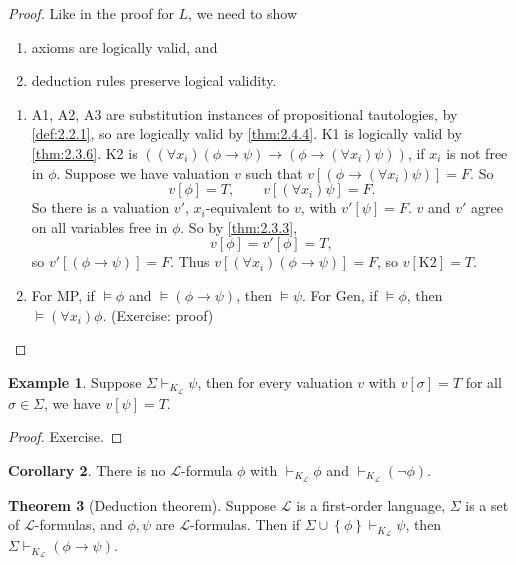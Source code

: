 \documentclass{article}
\renewcommand{\L}{\mathcal{L}}
\newcommand{\rb}[1]{\left( #1 \right)}
\renewcommand{\sb}[1]{\left[ #1 \right]}
\newcommand{\cb}[1]{\left\{ #1 \right\}}
\newcommand{\notb}[1]{\rb{\neg #1}}
\newcommand{\impb}[2]{\rb{#1 \rightarrow #2}}
\newcommand{\fab}[1]{\rb{\forall #1}}
\theoremstyle{definition}\newtheorem{definition}{Definition}[subsection]
\theoremstyle{definition}\newtheorem{remark1}[definition]{Remark}
\theoremstyle{definition}\newtheorem{example1}[definition]{Example}
\theoremstyle{definition}\newtheorem*{remark2}{Remark}
\theoremstyle{definition}\newtheorem*{example2}{Example}
\theoremstyle{definition}\newtheorem*{note}{Note}
\theoremstyle{definition}\newtheorem*{notation}{Notation}
\newtheorem{theorem}[definition]{Theorem}
\newtheorem{corollary}[definition]{Corollary}
\begin{document}
\begin{proof}
Like in the proof for $ L $, we need to show
\begin{enumerate}
\item axioms are logically valid, and
\item deduction rules preserve logical validity.
\end{enumerate}
\begin{enumerate}
\item A1, A2, A3 are substitution instances of propositional tautologies, by \ref{def:2.2.1}, so are logically valid by \ref{thm:2.4.4}. K1 is logically valid by \ref{thm:2.3.6}. K2 is $ \impb{\fab{x_i}\impb{\phi}{\psi}}{\impb{\phi}{\fab{x_i}\psi}} $, if $ x_i $ is not free in $ \phi $. Suppose we have valuation $ v $ such that $ v\sb{\impb{\phi}{\fab{x_i}\psi}} = F $. So
$$ v\sb{\phi} = T, \qquad v\sb{\fab{x_i}\psi} = F. $$
So there is a valuation $ v' $, $ x_i $-equivalent to $ v $, with $ v'\sb{\psi} = F $. $ v $ and $ v' $ agree on all variables free in $ \phi $. So by \ref{thm:2.3.3},
$$ v\sb{\phi} = v'\sb{\phi} = T, $$
so $ v'\sb{\impb{\phi}{\psi}} = F $. Thus $ v\sb{\fab{x_i}\impb{\phi}{\psi}} = F $, so $ v\sb{\text{K2}} = T $.
\item For MP, if $ \vDash \phi $ and $ \vDash \impb{\phi}{\psi} $, then $ \vDash \psi $. For Gen, if $ \vDash \phi $, then $ \vDash \fab{x_i}\phi $. (Exercise: proof)
\end{enumerate}
\end{proof}

\pagebreak

\begin{example1}
\label{eg:2.4.6}
Suppose $ \Sigma \vdash_{K_{\L}} \psi $, then for every valuation $ v $ with $ v\sb{\sigma} = T $ for all $ \sigma \in \Sigma $, we have $ v\sb{\psi} = T $.
\end{example1}

\begin{proof}
Exercise.
\end{proof}

\begin{corollary}
\label{cor:2.4.7}
There is no $ \L $-formula $ \phi $ with $ \vdash_{K_{\L}} \phi $ and $ \vdash_{K_{\L}} \notb{\phi} $.
\end{corollary}

\begin{theorem}[Deduction theorem]
Suppose $ \L $ is a first-order language, $ \Sigma $ is a set of $ \L $-formulas, and $ \phi, \psi $ are $ \L $-formulas. Then if $ \Sigma \cup \cb{\phi} \vdash_{K_{\L}} \psi $, then $ \Sigma \vdash_{K_{\L}} \impb{\phi}{\psi} $.
\end{theorem}
\end{document}

